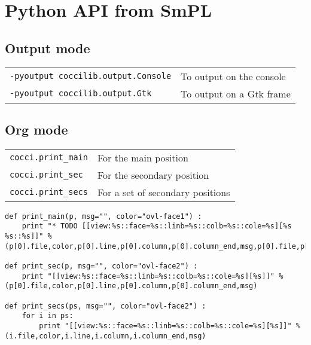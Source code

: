 \documentclass{article}
\begin{document}
\section{Python API from SmPL}
\label{sec:python-api}

\subsection{Output mode}
\label{sec:output}

\begin{tabular}{lp{8cm}}
\texttt{-pyoutput coccilib.output.Console}& To output on the console \\
\texttt{-pyoutput coccilib.output.Gtk}    & To output on a Gtk frame \\
\end{tabular}

\subsection{Org mode}
\label{sec:orgmode}

\begin{tabular}{lp{8cm}}
\texttt{cocci.print\_main}& For the main position            \\
\texttt{cocci.print\_sec} & For the secondary position       \\
\texttt{cocci.print\_secs}& For a set of secondary positions \\
\end{tabular}

\begin{lstlisting}
def print_main(p, msg="", color="ovl-face1") :
	print "* TODO [[view:%s::face=%s::linb=%s::colb=%s::cole=%s][%s %s::%s]]" % (p[0].file,color,p[0].line,p[0].column,p[0].column_end,msg,p[0].file,p[0].line)

def print_sec(p, msg="", color="ovl-face2") :
	print "[[view:%s::face=%s::linb=%s::colb=%s::cole=%s][%s]]" % (p[0].file,color,p[0].line,p[0].column,p[0].column_end,msg)

def print_secs(ps, msg="", color="ovl-face2") :
	for i in ps:
		print "[[view:%s::face=%s::linb=%s::colb=%s::cole=%s][%s]]" % (i.file,color,i.line,i.column,i.column_end,msg)
\end{lstlisting}

\end{document}
